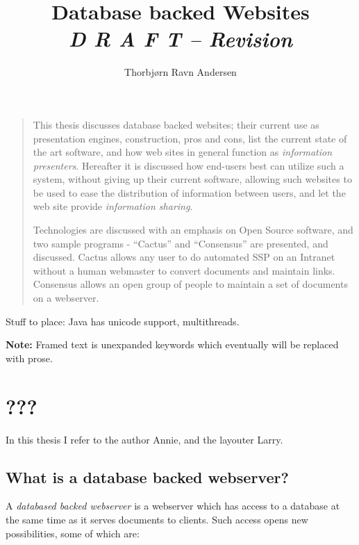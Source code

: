 \documentclass[draft,a4paper]{book}
\author{ Thorbj{\o}rn Ravn Andersen}
\title{Database backed Websites \\
  \textit{D R A F T -- $ $Revision$ $}} %
\begin{document}
\maketitle

\begin{quote}
  This thesis discusses database backed websites; their current use as
  presentation engines, construction, pros and cons, list the current
  state of the art software, and how web sites in general function as
  \textit{information presenters}.  Hereafter it is discussed how
  end-users best can utilize such a system, without giving up their
  current software, allowing such websites to be used to ease the
  distribution of information between users, and let the web site
  provide \textit{information sharing}.
  
  Technologies are discussed with an emphasis on Open Source software,
  and two sample programs - ``Cactus'' and ``Consensus'' are
  presented,  and discussed.  Cactus allows any user to do automated
  SSP on an Intranet without a human webmaster to convert documents
  and maintain links.  Consensus allows an open group of people to
  maintain a set of documents on a webserver.
  
\end{quote}

Stuff to place:  Java has unicode support, multithreads.


\textbf{Note: }Framed text is unexpanded keywords which eventually
will be replaced with prose.

\chapter{???}

In this thesis I refer to the author Annie, and the layouter Larry.  

\section{What is a database backed webserver?}

A \textit{databased backed webserver} is a webserver which has access
to a database at the same time as it serves documents to clients.
Such access opens new possibilities, some of which are:
\end{document}
